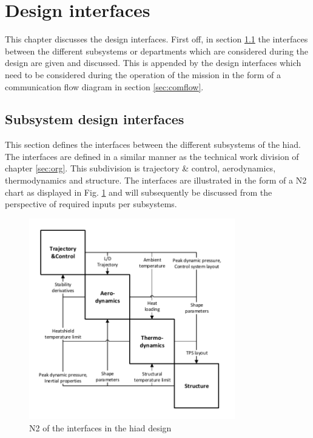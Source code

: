 \section{Design interfaces} \label{ch:di}

This chapter discusses the design interfaces. First off, in section \ref{sec:N2} the interfaces between the different subsystems or departments which are considered during the design are given and discussed. This is appended by the design interfaces which need to be considered during the operation of the mission in the form of a communication flow diagram in section \ref{sec:comflow}.

\subsection{Subsystem design interfaces} \label{sec:N2}
This section defines the interfaces between the different subsystems of the \gls{hiad}. The interfaces are defined in a similar manner as the technical work division of chapter \ref{sec:org}. This subdivision is trajectory \& control, aerodynamics, thermodynamics and structure. The interfaces are illustrated in the form of a N2 chart as displayed in Fig. \ref{fig:N2} and will subsequently be discussed from the perspective of required inputs per subsystems.

\begin{figure}[H]
\centering
\includegraphics[width = 0.8\textwidth]{Figure/N2.pdf}
\caption{N2 of the interfaces in the \gls{hiad} design}
\label{fig:N2}
\end{figure}

